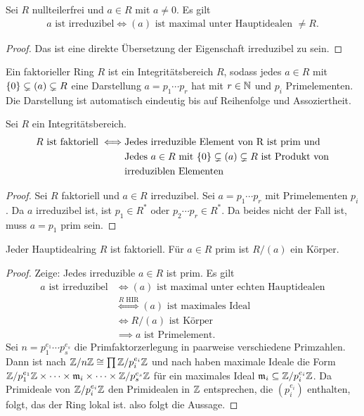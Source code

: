 \begin{Lemma}
    Sei \(R\) nullteilerfrei und \(a\in R\) mit \(a\neq 0\). Es gilt 
    \begin{align*}
        a \text{ ist irreduzibel} \iff (a) \text{ ist maximal unter Hauptidealen \(\neq R\).}
    \end{align*}
\end{Lemma}
\begin{proof}
    Das ist eine direkte Übersetzung der Eigenschaft irreduzibel zu sein.
\end{proof}
\begin{Def}
    Ein faktorieller Ring \(R\) ist ein Integritätsbereich \(R\), sodass jedes \(a\in R\) mit \(\{0\}\subsetneq (a)\subsetneq R\) eine Darstellung \(a=p_1\cdots p_r\) hat mit \(r\in\mathbb{N}\) und \(p_i\) Primelementen. Die Darstellung ist automatisch eindeutig bis auf Reihenfolge und Assoziertheit.
\end{Def}
\begin{Lemma}
    Sei \(R\) ein Integritätsbereich. 
    \begin{align*}
        R \text{ ist faktoriell} \iff& \text{Jedes irreduzible Element von R ist prim und}\\
        & \text{Jedes \(a\in R\) mit \(\{0\}\subsetneq (a)\subsetneq R\) ist Produkt von}\\
        &\text{irreduziblen Elementen}
    \end{align*}
\end{Lemma}
\begin{proof}
    Sei \(R\) faktoriell und \(a\in R\) irreduzibel. Sei \(a=p_1\cdots p_r\) mit Primelementen \(p_i\). Da \(a\) irreduzibel ist, ist \(p_1\in R^*\) oder \(p_2\cdots p_r\in R^*\). Da beides nicht der Fall ist, muss \(a=p_1\) prim sein.
\end{proof}
\begin{Satz}
    Jeder Hauptidealring \(R\) ist faktoriell. Für \(a\in R\) prim ist \(R/(a)\) ein Körper.
\end{Satz}
\begin{proof}
    Zeige: Jedes irreduzible \(a\in R\) ist prim. Es gilt 
    \begin{align*}
        a \text{ ist irreduzibel} &\iff (a) \text{ ist maximal unter echten Hauptidealen}\\
        &\stackrel{R \text{ HIR}}\iff (a) \text{ ist maximales Ideal}\\
        &\iff R/(a) \text{ ist Körper}\\
        &\implies a \text{ ist Primelement.}
    \end{align*}
    Sei \(n=p_1^{e_1}\cdots p_s^{e_s}\) die Primfaktorzerlegung in paarweise verschiedene Primzahlen. Dann ist nach  \(\mathbb{Z}/n\mathbb{Z}\cong \prod \mathbb{Z}/p_i^{e_i}\mathbb{Z}\) und nach  haben maximale Ideale die Form \(\mathbb{Z}/p_1^{e_1}\mathbb{Z}\times\dots\times \mathfrak{m}_i\times\dots\times \mathbb{Z}/p_s^{e_s}\mathbb{Z}\) für ein maximales Ideal \(\mathfrak{m}_i \subseteq \mathbb{Z}/p_i^{e_i}\mathbb{Z}\).
    Da Primideale von \(\mathbb{Z}/p_i^{e_i}\mathbb{Z}\) den Primidealen in \(\mathbb{Z}\) entsprechen, die \((p_i^{e_i})\) enthalten, folgt, das der Ring lokal ist. also folgt die Aussage.
\end{proof}

